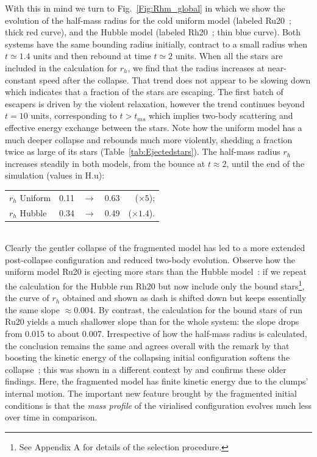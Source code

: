 With this in mind  we turn to Fig.~\ref{Fig:Rhm_global} in which we show the evolution of the half-mass radius for the cold uniform model (labeled Ru20~; thick red curve), and the Hubble model (labeled Rh20~; thin blue curve). Both systems have the same bounding radius initially, contract to a small radius when $t \simeq 1.4 $ units and then rebound at time $t \simeq 2 $ units. When all the stars are included in the calculation for $r_h$, we find that the radius increases at near-constant speed after the collapse. That trend does not appear to be slowing down which indicates that a fraction of the stars are escaping. The first batch of escapers is driven by the violent relaxation, however the trend continues beyond $ t = 10$ units, corresponding to $t > t_{ms}$ which implies two-body scattering and effective energy exchange between the stars. Note how the uniform model has a much deeper collapse and rebounds much more violently, shedding a fraction twice as large of its stars (Table~\ref{tab:Ejectedstars}). The half-mass radius $r_h$ increases steadily in both models, from the bounce at $t \approx 2$, until the end of the simulation (values in H.u):  

\begin{tabular}{lllrr}
$r_h$ Uniform & 0.11 &  $\rightarrow$ & 0.63 & ($\times 5$); \\
$r_h$ Hubble & 0.34  &  $\rightarrow$ & 0.49 & ($\times 1.4$). \\
\end{tabular}\\

%
Clearly the gentler collapse of the fragmented model has led to a more extended post-collapse configuration and reduced two-body evolution. Observe how the uniform model Ru20 is ejecting more stars than the Hubble model~: if we repeat the calculation for the Hubble run Rh20 but now include only the bound stars\footnote{See Appendix A for details of the selection procedure.}, the curve of $r_h$ obtained and shown as dash is shifted down but keeps essentially the same slope $\approx  0.004$. By contrast, the calculation for the bound stars of run Ru20 yields a much shallower slope than for the whole system: the slope drops from 0.015 to about 0.007. Irrespective of how the half-mass radius is calculated, the conclusion remains the same and agrees overall with the remark by \cite{caputo14} that boosting the kinetic energy of the collapsing initial configuration softens the collapse~; this was shown in a different context by \cite{theis99} and confirms these older findings.  Here, the fragmented model has finite kinetic energy due to the clumps' internal motion. The important new feature brought by the fragmented initial conditions is that the {\it mass profile} of the virialised configuration evolves much less over time in comparison. 

